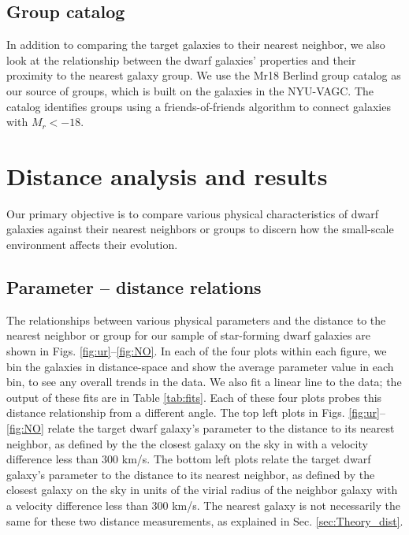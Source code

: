 \subsection{Group catalog}

In addition to comparing the target galaxies to their nearest neighbor, we also 
look at the relationship between the dwarf galaxies' properties and their 
proximity to the nearest galaxy group.  We use the Mr18 Berlind group catalog 
\cite{Berlind06} as our source of groups, which is built on the galaxies in the 
NYU-VAGC. The catalog identifies groups using a friends-of-friends algorithm 
\citep{Huchra82} to connect galaxies with $M_r < -18$.




\section[Results]{Distance analysis and results}

Our primary objective is to compare various physical characteristics of dwarf 
galaxies against their nearest neighbors or groups to discern how the 
small-scale environment affects their evolution.


\subsection{Parameter -- distance relations}\label{sec:Relations}

The relationships between various physical parameters and the distance to the 
nearest neighbor or group for our sample of star-forming dwarf galaxies are 
shown in Figs. \ref{fig:ur}--\ref{fig:NO}.  In each of the four plots within 
each figure, we bin the galaxies in distance-space and show the average 
parameter value in each bin, to see any overall trends in the data.  We also fit 
a linear line to the data; the output of these fits are in Table \ref{tab:fits}.  
Each of these four plots probes this distance relationship from a different 
angle.  The top left plots in Figs. \ref{fig:ur}--\ref{fig:NO} relate the target 
dwarf galaxy's parameter to the distance to its nearest neighbor, as defined by 
the the closest galaxy on the sky in \hMpc with a velocity difference less than 
300 km/s.  The bottom left plots relate the target dwarf galaxy's parameter to 
the distance to its nearest neighbor, as defined by the closest galaxy on the 
sky in units of the virial radius of the neighbor galaxy with a velocity 
difference less than 300 km/s.  The nearest galaxy is not necessarily the same 
for these two distance measurements, as explained in Sec. \ref{sec:Theory_dist}.


